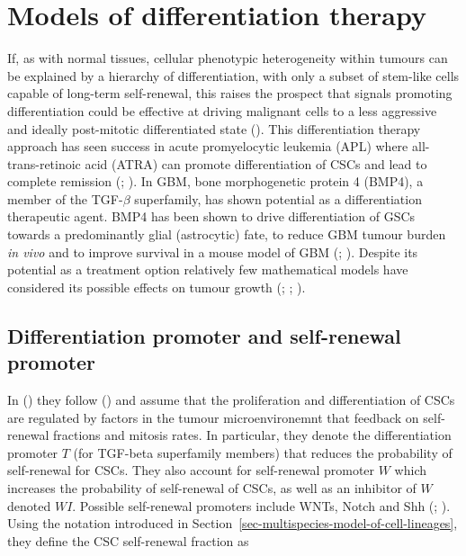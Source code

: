 \documentclass[
  letterpaper,
]{scrreprt}
\theoremstyle{definition}
\theoremstyle{remark}
\begin{document}
\section{Models of differentiation
therapy}\label{sec-models-of-differentiation-therapy}

If, as with normal tissues, cellular phenotypic heterogeneity within
tumours can be explained by a hierarchy of differentiation, with only a
subset of stem-like cells capable of long-term self-renewal, this raises
the prospect that signals promoting differentiation could be effective
at driving malignant cells to a less aggressive and ideally post-mitotic
differentiated state (). This differentiation therapy approach has seen success
in acute promyelocytic leukemia (APL) where all-trans-retinoic acid
(ATRA) can promote differentiation of CSCs and lead to complete
remission (;
). In GBM, bone morphogenetic
protein 4 (BMP4), a member of the TGF-\(\beta\) superfamily, has shown
potential as a differentiation therapeutic agent. BMP4 has been shown to
drive differentiation of GSCs towards a predominantly glial (astrocytic)
fate, to reduce GBM tumour burden \emph{in vivo} and to improve survival
in a mouse model of GBM (;
). Despite its
potential as a treatment option relatively few mathematical models have
considered its possible effects on tumour growth
(;
;
).

\subsection{Differentiation promoter and self-renewal
promoter}\label{sec-differentiation-promoter-and-self-renewal-promoter}

In () they follow
() and assume that the
proliferation and differentiation of CSCs are regulated by factors in
the tumour microenvironemnt that feedback on self-renewal fractions and
mitosis rates. In particular, they denote the differentiation promoter
\(T\) (for TGF-beta superfamily members) that reduces the probability of
self-renewal for CSCs. They also account for self-renewal promoter \(W\)
which increases the probability of self-renewal of CSCs, as well as an
inhibitor of \(W\) denoted \(WI\). Possible self-renewal promoters
include WNTs, Notch and Shh (; ). Using the notation introduced in
Section~\ref{sec-multispecies-model-of-cell-lineages}, they define the
CSC self-renewal fraction as
\end{document}
